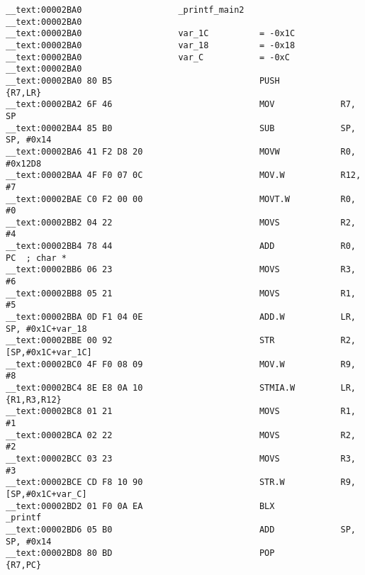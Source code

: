 \begin{lstlisting}
__text:00002BA0                   _printf_main2
__text:00002BA0
__text:00002BA0                   var_1C          = -0x1C
__text:00002BA0                   var_18          = -0x18
__text:00002BA0                   var_C           = -0xC
__text:00002BA0
__text:00002BA0 80 B5                             PUSH            {R7,LR}
__text:00002BA2 6F 46                             MOV             R7, SP
__text:00002BA4 85 B0                             SUB             SP, SP, #0x14
__text:00002BA6 41 F2 D8 20                       MOVW            R0, #0x12D8
__text:00002BAA 4F F0 07 0C                       MOV.W           R12, #7
__text:00002BAE C0 F2 00 00                       MOVT.W          R0, #0
__text:00002BB2 04 22                             MOVS            R2, #4
__text:00002BB4 78 44                             ADD             R0, PC  ; char *
__text:00002BB6 06 23                             MOVS            R3, #6
__text:00002BB8 05 21                             MOVS            R1, #5
__text:00002BBA 0D F1 04 0E                       ADD.W           LR, SP, #0x1C+var_18
__text:00002BBE 00 92                             STR             R2, [SP,#0x1C+var_1C]
__text:00002BC0 4F F0 08 09                       MOV.W           R9, #8
__text:00002BC4 8E E8 0A 10                       STMIA.W         LR, {R1,R3,R12}
__text:00002BC8 01 21                             MOVS            R1, #1
__text:00002BCA 02 22                             MOVS            R2, #2
__text:00002BCC 03 23                             MOVS            R3, #3
__text:00002BCE CD F8 10 90                       STR.W           R9, [SP,#0x1C+var_C]
__text:00002BD2 01 F0 0A EA                       BLX             _printf
__text:00002BD6 05 B0                             ADD             SP, SP, #0x14
__text:00002BD8 80 BD                             POP             {R7,PC}
\end{lstlisting}


